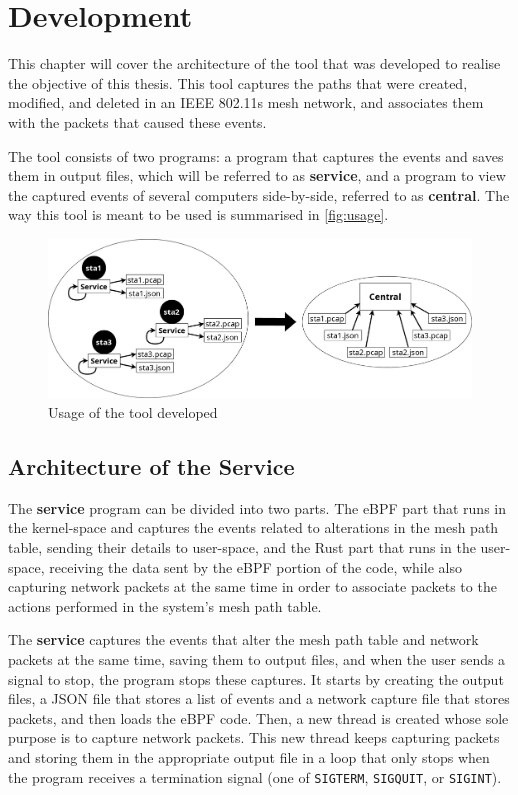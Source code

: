 \chapter{Development}\label{chap:devel}

This chapter will cover the architecture of the tool that was developed to
realise the objective of this thesis. This tool captures the paths that were
created, modified, and deleted in an \ac{IEEE} 802.11s mesh network, and
associates them with the packets that caused these events.

The tool consists of two programs: a program that captures the events and saves
them in output files, which will be referred to as \textbf{service}, and a
program to view the captured events of several computers side-by-side, referred
to as \textbf{central}. The way this tool is meant to be used is summarised in
\autoref{fig:usage}.

\begin{figure}[htb]
   \centering
   \includegraphics[scale=.225]{usage}
   \caption{Usage of the tool developed}\label{fig:usage}
\end{figure}


\section{Architecture of the Service}\label{sect:archser}

The \textbf{service} program can be divided into two parts. The eBPF part that
runs in the kernel-space and captures the events related to alterations in the
mesh path table, sending their details to user-space, and the Rust part that
runs in the user-space, receiving the data sent by the eBPF portion of the code,
while also capturing network packets at the same time in order to associate
packets to the actions performed in the system's mesh path table.

The \textbf{service} captures the events that alter the mesh path table and
network packets at the same time, saving them to output files, and when the user
sends a signal to stop, the program stops these captures. It starts by creating
the output files, a JSON file that stores a list of events and a network capture
file that stores packets, and then loads the eBPF code. Then, a new thread is
created whose sole purpose is to capture network packets. This new thread keeps
capturing packets and storing them in the appropriate output file in a loop that
only stops when the program receives a termination signal (one of
\texttt{SIGTERM}, \texttt{SIGQUIT}, or \texttt{SIGINT}).

